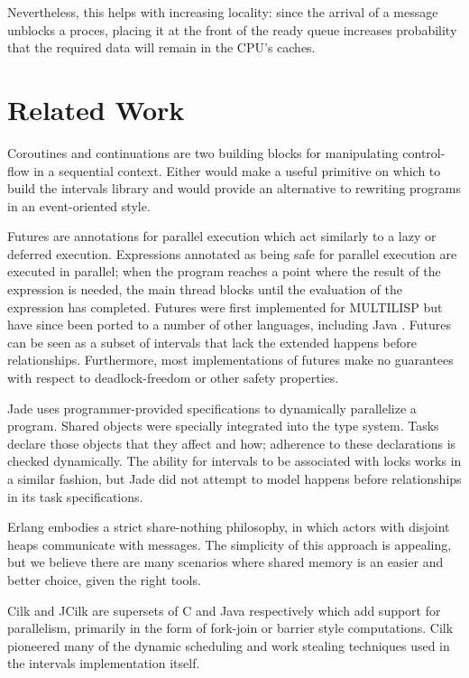 Nevertheless, this helps with increasing locality: since the arrival
of a message unblocks a proces, placing it at the front of the ready
queue increases probability that the required data will remain in the
CPU’s caches.


\section{Related Work}
\label{sec:queues-conclusion-related-work}


Coroutines \cite{Conway1963} and continuations \cite{Reynolds1993} are
two building blocks for manipulating control-flow in a sequential
context. Either would make a useful primitive on which to build the
intervals library and would provide an alternative to rewriting
programs in an event-oriented style.

Futures are annotations for parallel execution which act similarly to
a lazy or deferred execution. Expressions annotated as being safe for
parallel execution are executed in parallel; when the program reaches
a point where the result of the expression is needed, the main thread
blocks until the evaluation of the expression has completed. Futures
were first implemented for MULTILISP \cite{Halstead1985} but have
since been ported to a number of other languages, including Java
\cite{Navabi2008}.  Futures can be seen as a subset of intervals that
lack the extended happens before relationships. Furthermore, most
implementations of futures make no guarantees with respect to
deadlock-freedom or other safety properties.

Jade \cite{Rinard1998} uses programmer-provided specifications to
dynamically parallelize a program. Shared objects were specially
integrated into the type system. Tasks declare those objects that they
affect and how; adherence to these declarations is checked
dynamically. The ability for intervals to be associated with locks
works in a similar fashion, but Jade did not attempt to model happens
before relationships in its task specifications.

Erlang \cite{Erlang2010} embodies a strict share-nothing philosophy,
in which actors with disjoint heaps communicate with messages. The
simplicity of this approach is appealing, but we believe there are
many scenarios where shared memory is an easier and better choice,
given the right tools.

Cilk \cite{Blumofe1995, Frigo1998} and JCilk \cite{Danaher2005} are
supersets of C and Java respectively which add support for
parallelism, primarily in the form of fork-join or barrier style
computations. Cilk pioneered many of the dynamic scheduling and work
stealing techniques used in the intervals implementation itself.

